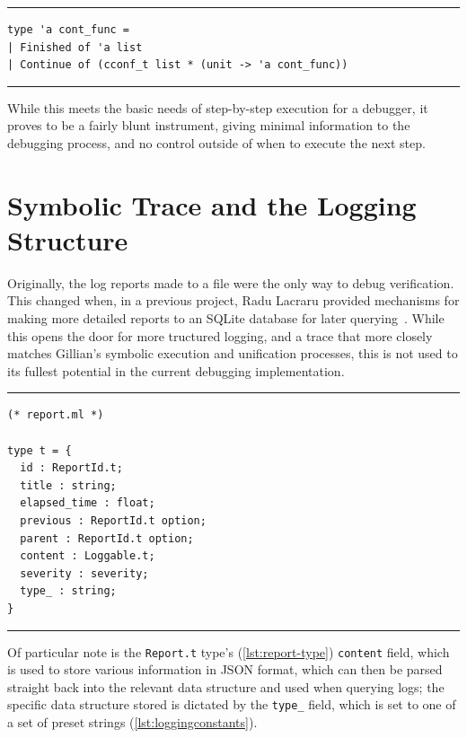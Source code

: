 \begin{listing}[!ht]
\noindent\rule{\textwidth}{0.5pt}
\vspace{-0.6cm}
\begin{verbatim}
type 'a cont_func =
| Finished of 'a list
| Continue of (cconf_t list * (unit -> 'a cont_func))
\end{verbatim}
\vspace{-0.4cm}
\noindent\rule{\textwidth}{0.5pt}
\vspace{-0.6cm}
\caption{The original \texttt{cont\_func} type}
\label{lst:contfunc-type-original}
\end{listing}

While this meets the basic needs of step-by-step execution for a debugger, it
proves to be a fairly blunt instrument, giving minimal information to the
debugging process, and no control outside of when to execute the next step.


\section{Symbolic Trace and the Logging Structure}\label{sec:current:trace}

Originally, the log reports made to a file were the only way to debug
verification. This changed when, in a previous project, Radu Lacraru provided
mechanisms for making more detailed reports to an SQLite database for later
querying~\cite{gillian-logging-2020}. While this opens the door for more 
tructured logging, and a trace that more closely matches Gillian's symbolic
execution and unification processes, this is not used to its fullest potential
in the current debugging implementation.

\begin{listing}[!ht]
\noindent\rule{\textwidth}{0.5pt}
\vspace{-0.6cm}
\begin{verbatim}
(* report.ml *)

type t = {
  id : ReportId.t;
  title : string;
  elapsed_time : float;
  previous : ReportId.t option;
  parent : ReportId.t option;
  content : Loggable.t;
  severity : severity;
  type_ : string;
}
\end{verbatim}
\vspace{-0.4cm}
\noindent\rule{\textwidth}{0.5pt}
\vspace{-0.6cm}
\caption{The \texttt{Report.t} type}
\label{lst:report-type}
\end{listing}

Of particular note is the \texttt{Report.t} type's (\autoref{lst:report-type})
\texttt{content} field, which is used to store various information in JSON
format, which can then be parsed straight back into the relevant data structure
and used when querying logs; the specific data structure stored is dictated by
the \texttt{type\_} field, which is set to one of a set of preset strings
(\autoref{lst:loggingconstants}).

